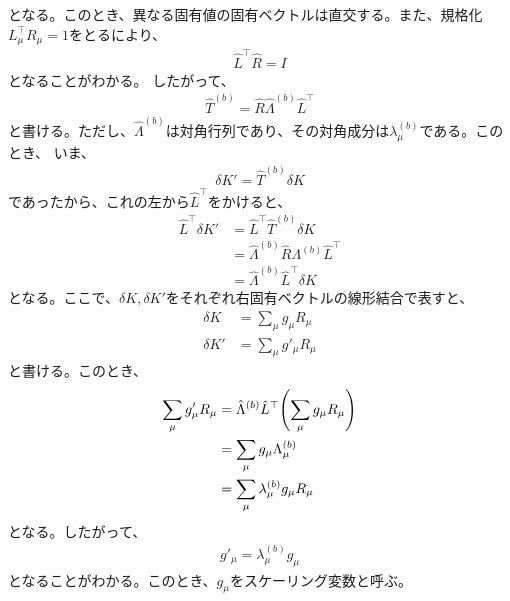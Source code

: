 \documentclass[a4paper,11pt]{jsarticle}
\numberwithin{equation}{section}
\begin{document}
となる。このとき、異なる固有値の固有ベクトルは直交する。また、規格化$L^{\top}_\mu R_{\mu}=1$をとるにより、
\begin{align}
    \hat{L}^{\top} \hat{R} = I
\end{align}
となることがわかる。%
したがって、
\begin{align}
    \hat{T}^{(b)} = \hat{R} \hat{\Lambda}^{(b)} \hat{L}^{\top}
\end{align}
と書ける。ただし、$\hat{\Lambda}^{(b)}$は対角行列であり、その対角成分は$\lambda_{\mu}^{(b)}$である。このとき、
いま、
\begin{align}
    \delta K' = \hat{T}^{(b)} \delta K
\end{align}
であったから、これの左から$\hat{L}^{\top}$をかけると、
\begin{align}
    \hat{L}^{\top} \delta K' &= \hat{L}^{\top} \hat{T}^{(b)} \delta K\\
    &= \hat{\Lambda}^{(b)} \hat{R}\Lambda^{(b)} \hat{L}^{\top} \\
    &= \hat{\Lambda}^{(b)} \hat{L}^{\top} \delta K
\end{align}
となる。ここで、$\delta K, \delta K'$をそれぞれ右固有ベクトルの線形結合で表すと、
\begin{align}
    \delta K &= \sum_{\mu} g_{\mu} R_{\mu}\\
    \delta K' &= \sum_{\mu} g'_{\mu} R_{\mu}
\end{align}
と書ける。このとき、
\begin{align}
    \sum_{\mu} g'_{\mu} R_{\mu} &= \hat{\Lambda}^{(b)} \hat{L}^{\top} \qty(\sum_{\mu} g_{\mu} R_{\mu})\\
    &= \sum_{\mu} g_{\mu} \Lambda_{\mu}^{(b)} \\
    &= \sum_{\mu} \lambda_{\mu}^{(b)} g_{\mu} R_{\mu}
\end{align}
となる。したがって、
\begin{align}
    g'_{\mu} = \lambda_{\mu}^{(b)} g_{\mu}
\end{align}
となることがわかる。このとき、$g_{\mu}$をスケーリング変数と呼ぶ。
\end{document}
